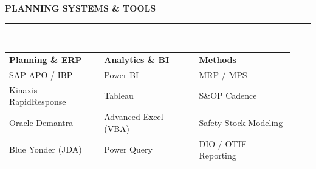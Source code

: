 \documentclass[10pt]{article}
\newcommand{\sectiontitle}[1]{%
  \vspace{2pt}
  {\color{navy}\fontsize{11.5}{13}\selectfont\bfseries #1}\\[-5pt]
  {\color{accent}\rule{\linewidth}{1.1pt}}\\[1pt]
}
\begin{document}
\sectiontitle{PLANNING SYSTEMS \& TOOLS}
\small
\begin{tabular}{@{}p{0.31\linewidth}p{0.31\linewidth}p{0.31\linewidth}@{}}
  \textbf{\color{navy}\small Planning \& ERP} & \textbf{\color{navy}\small Analytics \& BI} & \textbf{\color{navy}\small Methods} \\
  SAP APO / IBP & Power BI & MRP / MPS \\
  Kinaxis RapidResponse & Tableau & S\&OP Cadence \\
  Oracle Demantra & Advanced Excel (VBA) & Safety Stock Modeling \\
  Blue Yonder (JDA) & Power Query & DIO / OTIF Reporting \\
\end{tabular}
\end{document}
